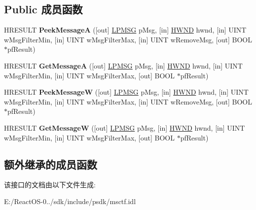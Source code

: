 \subsection*{Public 成员函数}
\begin{DoxyCompactItemize}
\item 
\mbox{\label{interface_i_tf_message_pump_ade867bba51b0e1fbb4a6b242c28a7517}} 
H\+R\+E\+S\+U\+LT {\bfseries Peek\+MessageA} (\mbox{[}out\mbox{]} \hyperlink{structtag_m_s_g}{L\+P\+M\+SG} p\+Msg, \mbox{[}in\mbox{]} \hyperlink{interfacevoid}{H\+W\+ND} hwnd, \mbox{[}in\mbox{]} U\+I\+NT w\+Msg\+Filter\+Min, \mbox{[}in\mbox{]} U\+I\+NT w\+Msg\+Filter\+Max, \mbox{[}in\mbox{]} U\+I\+NT w\+Remove\+Msg, \mbox{[}out\mbox{]} B\+O\+OL $\ast$pf\+Result)
\item 
\mbox{\label{interface_i_tf_message_pump_a2c59caa29e4d4777f8abb9c25ca74dc3}} 
H\+R\+E\+S\+U\+LT {\bfseries Get\+MessageA} (\mbox{[}out\mbox{]} \hyperlink{structtag_m_s_g}{L\+P\+M\+SG} p\+Msg, \mbox{[}in\mbox{]} \hyperlink{interfacevoid}{H\+W\+ND} hwnd, \mbox{[}in\mbox{]} U\+I\+NT w\+Msg\+Filter\+Min, \mbox{[}in\mbox{]} U\+I\+NT w\+Msg\+Filter\+Max, \mbox{[}out\mbox{]} B\+O\+OL $\ast$pf\+Result)
\item 
\mbox{\label{interface_i_tf_message_pump_a3a8ed53de7c7340848e3d94449d38284}} 
H\+R\+E\+S\+U\+LT {\bfseries Peek\+MessageW} (\mbox{[}out\mbox{]} \hyperlink{structtag_m_s_g}{L\+P\+M\+SG} p\+Msg, \mbox{[}in\mbox{]} \hyperlink{interfacevoid}{H\+W\+ND} hwnd, \mbox{[}in\mbox{]} U\+I\+NT w\+Msg\+Filter\+Min, \mbox{[}in\mbox{]} U\+I\+NT w\+Msg\+Filter\+Max, \mbox{[}in\mbox{]} U\+I\+NT w\+Remove\+Msg, \mbox{[}out\mbox{]} B\+O\+OL $\ast$pf\+Result)
\item 
\mbox{\label{interface_i_tf_message_pump_a7a2bb27fc9dfa435536d5dbd904dc1a5}} 
H\+R\+E\+S\+U\+LT {\bfseries Get\+MessageW} (\mbox{[}out\mbox{]} \hyperlink{structtag_m_s_g}{L\+P\+M\+SG} p\+Msg, \mbox{[}in\mbox{]} \hyperlink{interfacevoid}{H\+W\+ND} hwnd, \mbox{[}in\mbox{]} U\+I\+NT w\+Msg\+Filter\+Min, \mbox{[}in\mbox{]} U\+I\+NT w\+Msg\+Filter\+Max, \mbox{[}out\mbox{]} B\+O\+OL $\ast$pf\+Result)
\end{DoxyCompactItemize}
\subsection*{额外继承的成员函数}


该接口的文档由以下文件生成\+:\begin{DoxyCompactItemize}
\item 
E\+:/\+React\+O\+S-\/0../sdk/include/psdk/msctf.\+idl\end{DoxyCompactItemize}
